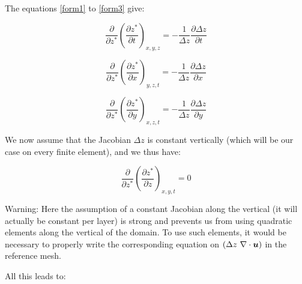 The equations \eqref{form1} to \eqref{form3} give:%

\begin{equation}
\dfrac{\partial}{\partial z^{\ast}}\left(  \dfrac{\partial z^{\ast}}{\partial
t}\right)  _{x,y,z}=-\dfrac{1}{\Delta z}\dfrac{\partial \Delta z}{\partial t}%
\end{equation}
%

\begin{equation}
\dfrac{\partial}{\partial z^{\ast}}\left(  \dfrac{\partial z^{\ast}}{\partial
x}\right)  _{y,z,t}=-\dfrac{1}{\Delta z}\dfrac{\partial \Delta z}{\partial x}%
\end{equation}
%

\begin{equation}
\dfrac{\partial}{\partial z^{\ast}}\left(  \dfrac{\partial z^{\ast}}{\partial
y}\right)  _{x,z,t}=-\dfrac{1}{\Delta z}\dfrac{\partial \Delta z}{\partial y}%
\end{equation}


We now assume that the Jacobian%
$\Delta z$ is constant vertically (which will be our case on every finite
element), and we thus have:%

\begin{equation}
\dfrac{\partial}{\partial z^{\ast}}\left(  \dfrac{\partial z^{\ast}}{\partial
z}\right)  _{x,y,t}=0
\end{equation}

\begin{WarningBlock}{Warning:}
Here the assumption of a constant Jacobian along the vertical (it will actually be constant per layer)
is strong and prevents us from using quadratic elements along the vertical of the domain.
To use such elements, it would be necessary to properly write the corresponding equation
on $(\Delta z~\nabla \cdot\bm{u})$ in the reference mesh.
\end{WarningBlock}

All this leads to:%

